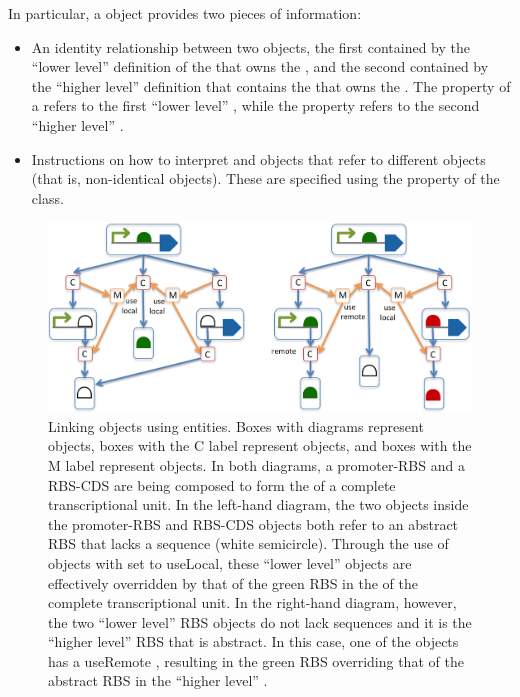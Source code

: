 In particular, a  object provides two pieces of information:
\begin{itemize}
\item An identity relationship between two  objects, the first contained by the ``lower level'' definition of the  that owns the
  , and the second contained by the ``higher level'' definition that contains the  that owns the . The  property of a  refers to the first ``lower level'' , while the  property refers to the second ``higher level'' .
\item Instructions on how to interpret  and   objects that refer to different  objects (that is, non-identical objects). These are specified using the  property of the  class.
\end{itemize}

\begin{figure}[ht]
\begin{center}
\includegraphics[scale=0.95]{images/MapsTo_Diagram3}
\caption{Linking  objects using  entities. Boxes with diagrams represent  objects, boxes with the C label represent  objects, and boxes with the M label represent  objects. In both diagrams, a promoter-RBS  and a RBS-CDS  are being composed to form the  of a complete transcriptional unit. In the left-hand diagram, the two  objects inside the promoter-RBS  and RBS-CDS  objects both refer to an abstract RBS  that lacks a sequence (white semicircle). Through the use of  objects with  set to useLocal, these ``lower level''  objects are effectively overridden by that of the green RBS in the  of the complete transcriptional unit. In the right-hand diagram, however, the two ``lower level'' RBS  objects do not lack sequences and it is the ``higher level'' RBS  that is abstract. In this case, one of the  objects has a useRemote , resulting in the green RBS  overriding that of the abstract RBS in the ``higher level'' .}
\label{image:maps_to_diagram2}
\end{center}
\end{figure}

